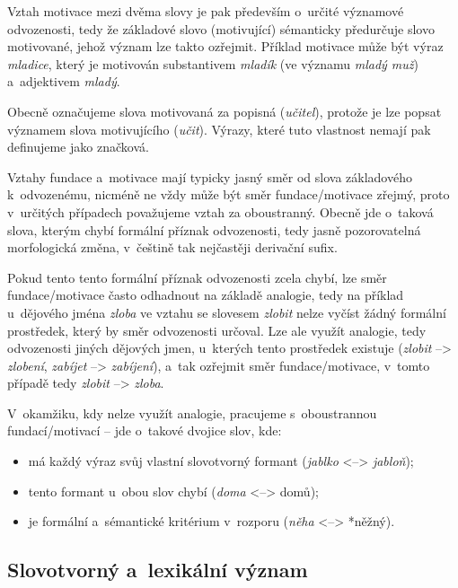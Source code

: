 Vztah motivace mezi dvěma slovy je pak především o~určité významové
odvozenosti, tedy že základové slovo (motivující) sémanticky předurčuje
slovo motivované, jehož význam lze takto ozřejmit.
\parencite[96]{dokulil00} Příklad motivace může být výraz
\emph{mladice}, který je motivován substantivem \emph{mladík} (ve
významu \emph{mladý muž}) a~adjektivem \emph{mladý}.
\parencite[110]{dokulil62}

Obecně označujeme slova motivovaná za popisná (\emph{učitel}), protože
je lze popsat významem slova motivujícího (\emph{učit}). Výrazy, které
tuto vlastnost nemají pak definujeme jako značková.
\parencite[96]{dokulil00}

Vztahy fundace a~motivace mají typicky jasný směr od slova základového
k~odvozenému, nicméně ne vždy může být směr fundace/motivace zřejmý, proto
v~určitých případech považujeme vztah za oboustranný. Obecně jde
o~taková slova, kterým chybí formální příznak odvozenosti, tedy jasně
pozorovatelná morfologická změna, v~češtině tak nejčastěji derivační
sufix.~\parencite[96]{dokulil00}

Pokud tento tento formální příznak odvozenosti zcela chybí, lze směr
fundace/motivace často odhadnout na základě analogie, tedy na příklad
u~dějového jména \emph{zloba} ve vztahu se slovesem \emph{zlobit} nelze
vyčíst žádný formální prostředek, který by směr odvozenosti určoval. Lze
ale využít analogie, tedy odvozenosti jiných dějových jmen, u~kterých
tento prostředek existuje (\emph{zlobit} --\textgreater{}
\emph{zlobení}, \emph{zabíjet} --\textgreater{} \emph{zabíjení}), a~tak
ozřejmit směr fundace/motivace, v~tomto případě tedy \emph{zlobit}
--\textgreater{} \emph{zloba}.~\parencite[96]{dokulil00}

V~okamžiku, kdy nelze využít analogie, pracujeme s~oboustrannou
fundací/motivací -- jde o~takové dvojice slov, kde:

\begin{itemize}
\tightlist
\item
  má každý výraz svůj vlastní slovotvorný formant (\emph{jablko}
  \textless{}--\textgreater{} \emph{jabloň});
\item
  tento formant u~obou slov chybí (\emph{doma}
  \textless{}--\textgreater{} domů);
\item
  je formální a~sémantické kritérium v~rozporu (\emph{něha}
  \textless{}--\textgreater{} *něžný).~\parencite[96]{dokulil00}
\end{itemize}

\hypertarget{slovotvornuxfd-a-lexikuxe1lnuxed-vuxfdznam}{%
\subsection{Slovotvorný a~lexikální
význam}\label{slovotvornuxfd-a-lexikuxe1lnuxed-vuxfdznam}}

